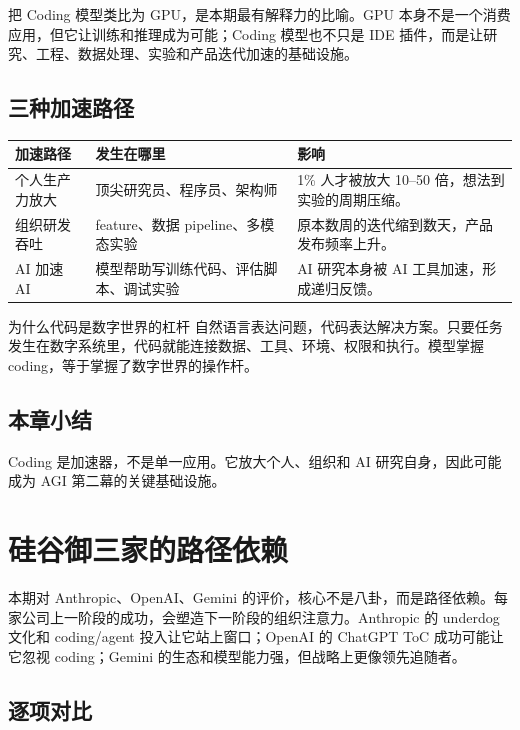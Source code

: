 \documentclass[a4paper]{article}
\begin{document}
把 Coding 模型类比为 GPU，是本期最有解释力的比喻。GPU 本身不是一个消费应用，但它让训练和推理成为可能；Coding 模型也不只是 IDE 插件，而是让研究、工程、数据处理、实验和产品迭代加速的基础设施。

\subsection{三种加速路径}

\noindent\begin{tabularx}{\textwidth}{p{}p{}X}
\toprule
加速路径 & 发生在哪里 & 影响 \\
\midrule
个人生产力放大 & 顶尖研究员、程序员、架构师 & 1\% 人才被放大 10--50 倍，想法到实验的周期压缩。 \\
组织研发吞吐 & feature、数据 pipeline、多模态实验 & 原本数周的迭代缩到数天，产品发布频率上升。 \\
AI 加速 AI & 模型帮助写训练代码、评估脚本、调试实验 & AI 研究本身被 AI 工具加速，形成递归反馈。 \\
\bottomrule
\end{tabularx}

\begin{knowledgebox}{为什么代码是数字世界的杠杆}
自然语言表达问题，代码表达解决方案。只要任务发生在数字系统里，代码就能连接数据、工具、环境、权限和执行。模型掌握 coding，等于掌握了数字世界的操作杆。
\end{knowledgebox}

\subsection{本章小结}

Coding 是加速器，不是单一应用。它放大个人、组织和 AI 研究自身，因此可能成为 AGI 第二幕的关键基础设施。

\section{硅谷御三家的路径依赖}

本期对 Anthropic、OpenAI、Gemini 的评价，核心不是八卦，而是路径依赖。每家公司上一阶段的成功，会塑造下一阶段的组织注意力。Anthropic 的 underdog 文化和 coding/agent 投入让它站上窗口；OpenAI 的 ChatGPT ToC 成功可能让它忽视 coding；Gemini 的生态和模型能力强，但战略上更像领先追随者。

\subsection{逐项对比}
\end{document}
